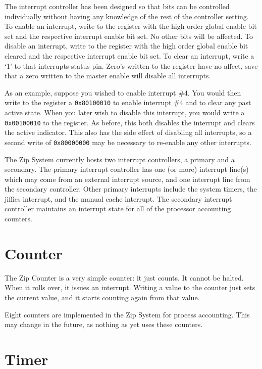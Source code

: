 \documentclass{gqtekspec}
\begin{document}
The interrupt controller has been designed so that bits can be controlled
individually without having any knowledge of the rest of the controller
setting.  To enable an interrupt, write to the register with the high order
global enable bit set and the respective interrupt enable bit set.  No other
bits will be affected.  To disable an interrupt, write to the register with
the high order global enable bit cleared and the respective interrupt enable
bit set.  To clear an interrupt, write a `1' to that interrupts status pin.
Zero's written to the register have no affect, save that a zero written to the
master enable will disable all interrupts.

As an example, suppose you wished to enable interrupt \#4.  You would then
write to the register a {\tt 0x80100010} to enable interrupt \#4 and to clear
any past active state.  When you later wish to disable this interrupt, you would
write a {\tt 0x00100010} to the register.  As before, this both disables the
interrupt and clears the active indicator.  This also has the side effect of
disabling all interrupts, so a second write of {\tt 0x80000000} may be necessary
to re-enable any other interrupts.

The Zip System currently hosts two interrupt controllers, a primary and a 
secondary.  The primary interrupt controller has one (or more) interrupt line(s)
which may come from an external interrupt source, and one interrupt line from
the secondary controller.  Other primary interrupts include the system timers,
the jiffies interrupt, and the manual cache interrupt.  The secondary interrupt
controller maintains an interrupt state for all of the processor accounting
counters.

\section{Counter}

The Zip Counter is a very simple counter: it just counts.  It cannot be
halted.  When it rolls over, it issues an interrupt.  Writing a value to the
counter just sets the current value, and it starts counting again from that
value.

Eight counters are implemented in the Zip System for process accounting.
This may change in the future, as nothing as yet uses these counters.

\section{Timer}
\end{document}
